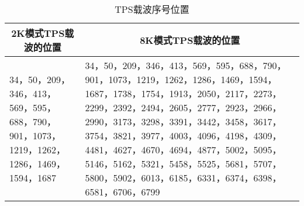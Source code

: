 \begin{table}[!hbp]
	\centering
	\caption{TPS载波序号位置}
	\begin{tabular}{|p{5cm}|p{5cm}|}
	\hline\hline
	\multicolumn{1}{|c|}{2K模式TPS载波的位置} & \multicolumn{1}{c|}{8K模式TPS载波的位置} \\
	\hline
	34，50，209，346，413，569，595，688，790，901，1073，1219，1262，1286，1469，1594，1687 & 34，50，209，346，413，569，595，688，790，901，1073，1219，1262，1286，1469，1594，1687，1738，1754，1913，2050，2117，2273，2299，2392，2494，2605，2777，2923，2966，2990，3173，3298，3391，3442，3458，3617，3754，3821，3977，4003，4096，4198，4309，4481，4627，4670，4694，4877，5002，5095，
5146，5162，5321，5458，5525，5681，5707，5800，5902，6013，6185，6331，6374，6398，6581，6706，6799 \\
	\hline\hline
	\end{tabular}
	\label{table:tps_carrier}
\end{table}

\endinput